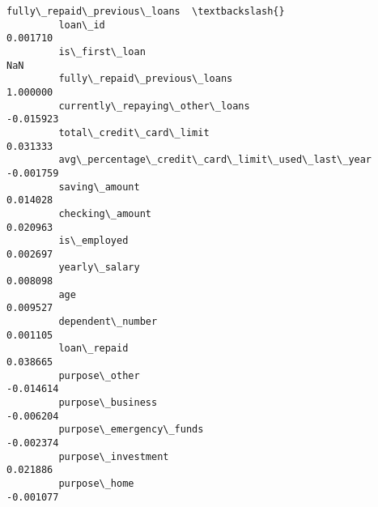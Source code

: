 \documentclass{report}
\begin{document}
\begin{Verbatim}[commandchars=\\\{\}]
                                                          fully\_repaid\_previous\_loans  \textbackslash{}
         loan\_id                                                             0.001710   
         is\_first\_loan                                                            NaN   
         fully\_repaid\_previous\_loans                                         1.000000   
         currently\_repaying\_other\_loans                                     -0.015923   
         total\_credit\_card\_limit                                             0.031333   
         avg\_percentage\_credit\_card\_limit\_used\_last\_year                    -0.001759   
         saving\_amount                                                       0.014028   
         checking\_amount                                                     0.020963   
         is\_employed                                                         0.002697   
         yearly\_salary                                                       0.008098   
         age                                                                 0.009527   
         dependent\_number                                                    0.001105   
         loan\_repaid                                                         0.038665   
         purpose\_other                                                      -0.014614   
         purpose\_business                                                   -0.006204   
         purpose\_emergency\_funds                                            -0.002374   
         purpose\_investment                                                  0.021886   
         purpose\_home                                                       -0.001077   
         

\end{Verbatim}
\end{document}
